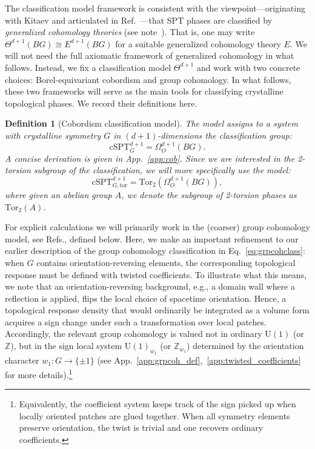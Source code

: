 \documentclass[aps,prx,reprint,superscriptaddress,twocolumn,amsmath,amssymb,amsfonts, nofootinbib]{revtex4-2}
\newcommand{\U}{\text{U}}
\newcommand{\cspt}{\text{cSPT}^{d+1}_{G}}
\newcommand{\tor}{\text{Tor}}
\newcommand{\Z}{\mathbb{Z}}
\theoremstyle{apsstyle}
\newtheorem{definition}[theorem]{Definition}
\begin{document}
\bigskip 

The classification model framework is consistent with the viewpoint—originating with Kitaev and articulated in Ref.~\cite{Gaiotto2019}—that SPT phases are classified by \emph{generalized cohomology theories} (see note~\cite{note_GCT}). That is, one may write $\Theta^{d+1}(BG)\cong E^{d+1}(BG)$ for a suitable generalized cohomology theory $E$. We will not need the full axiomatic framework of generalized cohomology in what follows. Instead, we fix a classification model $\Theta^{d+1}$ and work with two concrete choices: Borel-equivariant cobordism and group cohomology. In what follows, these two frameworks will serve as the main tools for classifying crystalline topological phases. We record their definitions here.

\bigskip 

\begin{definition}[Cobordism classification model]
\label{def:cob_classmodel}
The model assigns to a system with crystalline symmetry $G$ in $(d+1)$-dimensions the classification group:
\begin{equation*}
    \cspt = \Omega^{d+1}_{O}(BG).
\end{equation*}
A concise derivation is given in App.~\ref{app:cob}. Since we are interested in the 2-torsion subgroup of the classification, we will more specifically use the model: 
\begin{equation}    \mathrm{cSPT}^{d+1}_{G,\mathrm{tor}} = \tor_{2}(\Omega^{d+1}_{O}(BG)),
\label{eq:cob_model}
\end{equation}
where given an abelian group $A$, we denote the subgroup of 2-torsion phases as $\tor_{2}(A)$.
\end{definition}

\bigskip 


For explicit calculations we will primarily work in the (coarser) group cohomology model, see Refs.\cite{Chen2013,ChenScience,ThorngrenElse}, defined below. Here, we make an important refinement to our earlier description of the group cohomology classification in Eq.~\ref{eq:grpcohclass}: when $G$ contains orientation-reversing elements, the corresponding topological response must be defined with twisted coefficients. To illustrate what this means, we note that an orientation-reversing background, e.g., a domain wall where a reflection is applied, flips the local choice of spacetime orientation. Hence, a topological response density that would ordinarily be integrated as a volume form acquires a sign change under such a transformation over local patches. Accordingly, the relevant group cohomology is valued not in ordinary $\U(1)$ (or $\Z$), but in the sign local system $\U(1)_{w_{1}}$ (or $\Z_{w_{1}}$) determined by the orientation character $w_{1}:G\to \{\pm1\}$ (see App.~\ref{app:grpcoh_def},~\ref{app:twisted_coefficients} for more details).\footnote{Equivalently, the coefficient system keeps track of the sign picked up when locally oriented patches are glued together. When all symmetry elements preserve orientation, the twist is trivial and one recovers ordinary coefficients.}
\end{document}
